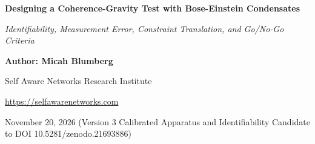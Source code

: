 \documentclass[
  american,
  11pt,
  letterpaper,
]{article}
\author{}
\date{}
\begin{document}
\begin{center}

{\LARGE\bfseries Designing a Coherence-Gravity Test with Bose-Einstein Condensates\par}

\vspace{0.35em}

{\large\itshape Identifiability, Measurement Error, Constraint Translation, and Go/No-Go Criteria\par}

\vspace{0.8em}

{\small\textbf{Author: Micah Blumberg}\par}

{\small Self Aware Networks Research Institute\par}

{\small\url{https://selfawarenetworks.com}\par}

{\small November 20, 2026 (Version 3 Calibrated Apparatus and Identifiability Candidate to DOI 10.5281/zenodo.21693886)\par}

\end{center}

\vspace{0.65em}
\end{document}
